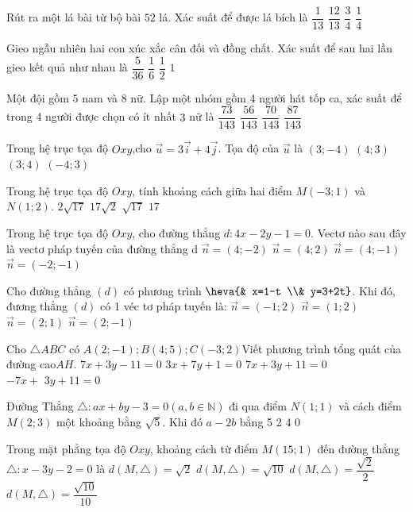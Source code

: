 \begin{ex}
Rút ra một lá bài từ bộ bài $52$ lá. Xác suất để được lá bích là
\choice
{$\dfrac{1}{13}$}
{$\dfrac{12}{13}$}
{$\dfrac{3}{4}$}
{$\dfrac{1}{4}$}
\end{ex}
\begin{ex}
Gieo ngẫu nhiên hai con xúc xắc cân đối và đồng chất. Xác suất để sau hai lần gieo kết quả như nhau là
\choice
{$\dfrac{5}{36}$}
{$\dfrac{1}{6}$}
{$\dfrac{1}{2}$}
{$1$}
\end{ex}
\begin{ex}
Một đội gồm $5$ nam và $8$ nữ. Lập một nhóm gồm 4 người hát tốp ca, xác suất để trong 4 người được chọn có ít nhất $3$ nữ là
\choice
{$\dfrac{73}{143}$}
{$\dfrac{56}{143}$}
{$\dfrac{70}{143}$}
{$\dfrac{87}{143}$}
\end{ex}
\begin{ex}
Trong hệ trục tọa độ $Oxy$,cho $\vec{u}=3\vec{i}+4\vec{j}$. Tọa độ của $\vec{u}$ là
\choice
{$(3;-4)$}
{$(4;3)$}
{$(3;4)$}
{$(-4;3)$}
\end{ex}
\begin{ex}
Trong hệ trục tọa độ $Oxy$, tính khoảng cách giữa hai điểm $M(-3;1)$ và $N(1;2)$.
\choice
{$2\sqrt{17}$}
{$17\sqrt{2}$}
{$\sqrt{17}$}
{$17$}
\end{ex}
\begin{ex}
Trong hệ trục tọa độ $Oxy$, cho đường thẳng $d\colon 4x-2y-1=0$. Vectơ nào sau đây là vectơ pháp tuyến của đường thẳng d
\choice
{$\vec{n}=(4;-2)$}
{$\vec{n}=(4;2)$}
{$\vec{n}=(4;-1)$}
{$\vec{n}=(-2;-1)$}
\end{ex}
\begin{ex}
Cho đường thẳng $(d)$ có phương trình $\heva{& x=1-t \\& y=3+2t} $. Khi đó, đương thẳng $(d)$ có 1 véc tơ pháp tuyến là:
\choice
{$\vec{n}=(-1;2)$}
{$\vec{n}=(1;2)$}
{$\vec{n}=(2;1)$}
{$\vec{n}=(2;-1)$}
\end{ex}
\begin{ex}
Cho $\triangle ABC$ có $A(2;-1); B(4;5); C(-3;2)$Viết phương trình tổng quát của đường cao$AH$.
\choice
{$7x + 3y-11 = 0$}
{$3x + 7y + 1 = 0$}
{$7x + 3y +11 = 0$}
{$-7x +\text{ 3}y + 11 = 0$}
\end{ex}
\begin{ex}
Đường Thẳng $\triangle \colon ax+by-3=0(a,b\in \mathbb{N})$ đi qua điểm $N(1;1)$ và cách điểm $M(2;3)$ một khoảng bằng $\sqrt{5}$. Khi đó $a-2b$ bằng
\choice
{5}
{2}
{4}
{0}
\end{ex}
\begin{ex}
Trong mặt phẳng tọa độ $Oxy$, khoảng cách từ điểm $M(15;1)$ đến đường thẳng $\triangle \colon x-3y-2=0$ là
\choice
{$d\left(M,\triangle\right)=\sqrt{2}$}
{$d\left(M,\triangle\right)=\sqrt{10}$}
{$d\left(M,\triangle\right)=\dfrac{\sqrt{2}}{2}$}
{$d\left(M,\triangle\right)=\dfrac{\sqrt{10}}{10}$}
\end{ex}
